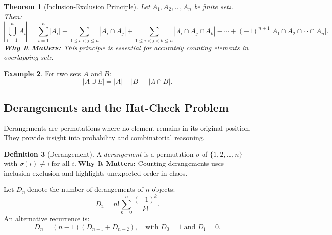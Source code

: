 \documentclass[12pt]{article}
\newtheorem{theorem}{Theorem}[section]
\theoremstyle{definition}
\newtheorem{definition}[theorem]{Definition}
\newtheorem{example}[theorem]{Example}
\begin{document}
\begin{theorem}[Inclusion-Exclusion Principle]
  Let \(A_1, A_2, \dots, A_n\) be finite sets. Then:
  \[
  \left| \bigcup_{i=1}^{n} A_i \right| = \sum_{i=1}^{n} |A_i| - \sum_{1\le i < j \le n} |A_i \cap A_j| + \sum_{1\le i < j < k \le n} |A_i \cap A_j \cap A_k| - \cdots + (-1)^{n+1} |A_1 \cap A_2 \cap \cdots \cap A_n|.
  \]
  \vspace{0.5em}
  \textbf{Why It Matters:} This principle is essential for accurately counting elements in overlapping sets.
\end{theorem}

\begin{center}
\end{center}

\begin{example}
  For two sets \(A\) and \(B\):
  \[
  |A \cup B| = |A| + |B| - |A \cap B|.
  \]
\end{example}

\subsection{Derangements and the Hat-Check Problem}

Derangements are permutations where no element remains in its original position. They provide insight into probability and combinatorial reasoning.

\begin{definition}[Derangement]
  A \emph{derangement} is a permutation \(\sigma\) of \(\{1,2,\dots,n\}\) with \(\sigma(i) \neq i\) for all \(i\).
  \vspace{0.5em}
  \textbf{Why It Matters:} Counting derangements uses inclusion-exclusion and highlights unexpected order in chaos.
\end{definition}

Let \(D_n\) denote the number of derangements of \(n\) objects:
\[
D_n = n! \sum_{k=0}^{n} \frac{(-1)^k}{k!}.
\]
An alternative recurrence is:
\[
D_n = (n-1)(D_{n-1} + D_{n-2}), \quad \text{with } D_0 = 1 \text{ and } D_1 = 0.
\]
\end{document}

